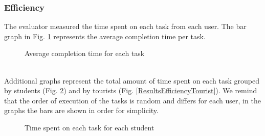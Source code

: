 \subsubsection{Efficiency}
    The evaluator measured the time spent on each task from each user. The bar graph in Fig. \ref{ResultsEfficiencyAvg} represents the average completion time per task.
    \begin{figure}[!ht]
        \begin{minipage}{\linewidth}
            \centering
            \captionsetup{justification=centering}
            \caption{Average completion time for each task}
            \label{ResultsEfficiencyAvg}
        \end{minipage}
    \end{figure}
    \pagebreak
    \\
    Additional graphs represent the total amount of time spent on each task grouped by students (Fig. \ref{ResultsEfficiencyStudent}) and by tourists (Fig. \ref{ResultsEfficiencyTourist}). We remind that the order of execution of the tasks is random and differs for each user, in the graphs the bars are shown in order for simplicity.\\
    \begin{figure}[!ht]
        \begin{minipage}{\linewidth}
            \centering
            \captionsetup{justification=centering}
            \caption{Time spent on each task for each student}
            \label{ResultsEfficiencyStudent}
        \end{minipage}
    \end{figure}
